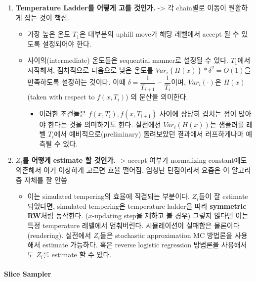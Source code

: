 \documentclass[
]{book}
\providecommand{\tightlist}{%
  \setlength{\itemsep}{0pt}\setlength{\parskip}{0pt}}
\begin{document}
\begin{enumerate}
\def\labelenumi{\arabic{enumi}.}
\tightlist
\item
  \textbf{Temperature Ladder를 어떻게 고를 것인가.} -\textgreater{} 각 chain별로 이동이 원활하게 잡는 것이 핵심.

  \begin{itemize}
  \tightlist
  \item
    가장 높은 온도 \(T_1\)은 대부분의 uphill move가 해당 레벨에서 accept 될 수 있도록 설정되어야 한다.
  \item
    사이의(intermediate) 온도들은 sequential manner로 설정될 수 있다. \(T_1\)에서 시작해서, 점차적으로 다음으로 낮은 온도를 \(Var_i \left\{ H(x) \right\} \ast \delta^2 = O(1)\)을 만족하도록 설정하는 것이다. 이때 \(\delta = \dfrac {1}{T_{i+1}} - \dfrac{1}{T_i}\)이며, \(Var_i(\cdot)\)은 \(H(x)\) (taken with respect to \(f(x, T_i)\)) 의 분산을 의미한다.

    \begin{itemize}
    \tightlist
    \item
      이러한 조건들은 \(f(x,T_i), f(x,T_{i+1})\) 사이에 상당히 겹치는 점이 많아야 한다는 것을 의미하기도 한다. 실전에선 \(Var_i \left( H(x) \right)\)는 샘플러를 레벨 \(T_i\)에서 예비적으로(preliminary) 돌려보았던 결과에서 러프하게나마 예측될 수 있다.\\
    \end{itemize}
  \end{itemize}
\item
  \textbf{\(Z_i\)를 어떻게 estimate 할 것인가.} -\textgreater{} accept 여부가 normalizing constant에도 의존해서 이거 이상하게 고르면 효율 떨어짐. 엄청난 단점이라서 요즘은 이 알고리즘 자체를 잘 안씀

  \begin{itemize}
  \tightlist
  \item
    이는 simulated tempering의 효율에 직결되는 부분이다. \(Z_i\)들이 잘 estimate 되었다면, simulated tempering은 temperature ladder을 따라 \textbf{symmetric RW}처럼 동작한다. (\(x\)-updating step을 제하고 볼 경우) 그렇지 않다면 이는 특정 temperature 레벨에서 멈춰버린다. 시뮬레이션이 실패함은 물론이다(rendering). 실전에서 \(Z_i\)들은 stochastic approximation MC 방법론을 사용해서 estimate 가능하다. 혹은 reverse logistic regression 방법론을 사용해서도 \(Z_i\)를 estimate 할 수 있다.
  \end{itemize}
\end{enumerate}

\hypertarget{slice-sampler}{%
\paragraph{Slice Sampler}\label{slice-sampler}}
\end{document}
